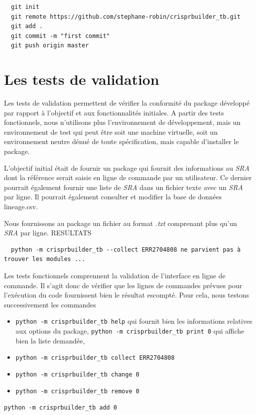 \documentclass[twoside,a4paper,11pt,frenchb,openany]{report}
\begin{document}
\begin{verbatim}
  git init
  git remote https://github.com/stephane-robin/crisprbuilder_tb.git
  git add .
  git commit -m "first commit"
  git push origin master
\end{verbatim} 





\section{Les tests de validation}

Les tests de validation permettent de vérifier la conformité du package développé par rapport à l'objectif et aux fonctionnalités initiales. A partir des tests fonctionnels, nous n'utilisons plus l'environnement de développement, mais un environnement de test qui peut être soit une machine virtuelle, soit un environnement neutre dénué de toute spécification, mais capable d'installer le package.

L'objectif initial était de fournir un package qui fournit des informations au \textit{SRA} dont la référence serait saisie en ligne de commande par un utilisateur. Ce dernier pourrait également fournir une liste de \textit{SRA} dans un fichier texte avec un \textit{SRA} par ligne. Il pourrait également consulter et modifier la base de données lineage.csv.

Nous fournissons au package un fichier au format \textit{.txt} comprenant plus qu'un \textit{SRA} par ligne. RESULTATS  

\begin{verbatim}
  python -m crisprbuilder_tb --collect ERR2704808 ne parvient pas à trouver les modules ...
\end{verbatim}

Les tests fonctionnels comprennent la validation de l'interface en ligne de commande. Il s'agit donc de vérifier que les lignes de commandes prévues pour l'exécution du code fournissent bien le résultat escompté. Pour cela, nous testons successivement les commandes

\begin{itemize}
\item \texttt{python -m crisprbuilder\_tb \textemdash \textemdash help} qui fournit bien les informations relatives aux options du package,
\texttt{python -m crisprbuilder\_tb \textemdash \textemdash print 0} qui affiche bien la liste demandée,
\item \texttt{python -m crisprbuilder\_tb \textemdash \textemdash collect ERR2704808}
\item \texttt{python -m crisprbuilder\_tb \textemdash \textemdash change 0}
\item \texttt{python -m crisprbuilder\_tb \textemdash \textemdash remove 0}
\end{itemize}
\texttt{python -m crisprbuilder\_tb \textemdash \textemdash add 0}
\end{document}
